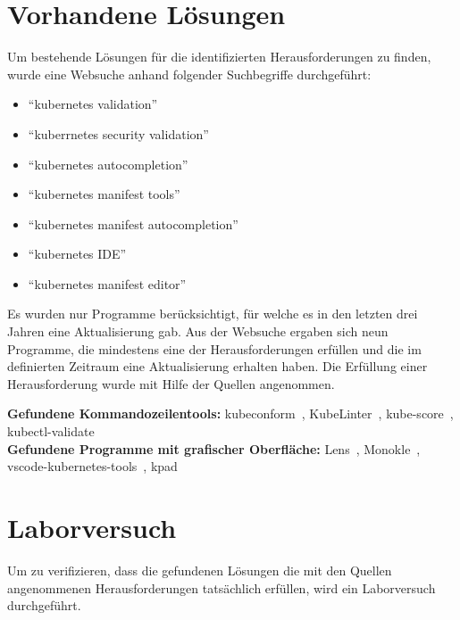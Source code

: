 \section{Vorhandene Lösungen}

Um bestehende Lösungen für die identifizierten Herausforderungen zu finden, wurde eine Websuche anhand folgender Suchbegriffe durchgeführt:
\begin{itemize}
  \setlength\itemsep{-0.5cm}
  \item ``kubernetes validation''
  \item ``kuberrnetes security validation''
  \item ``kubernetes autocompletion''
  \item ``kubernetes manifest tools''
  \item ``kubernetes manifest autocompletion''
  \item ``kubernetes IDE''
  \item ``kubernetes manifest editor''
\end{itemize}

Es wurden nur Programme berücksichtigt, für welche es in den letzten drei Jahren eine Aktualisierung gab.
Aus der Websuche ergaben sich neun Programme, die mindestens eine der Herausforderungen erfüllen und die
im definierten Zeitraum eine Aktualisierung erhalten haben.
Die Erfüllung einer Herausforderung wurde mit Hilfe der Quellen angenommen.

\textbf{Gefundene Kommandozeilentools:} kubeconform~\cite{kubeconform-source}, KubeLinter~\cite{kubelinter-source}, kube-score~\cite{kubescore-source}, kubectl-validate~\cite{kubectl-validate-source}
\\
\textbf{Gefundene Programme mit grafischer Oberfläche:} Lens~\cite{kubernetes-lens-source}, Monokle~\cite{monokle-source}, vscode-kubernetes-tools~\cite{vscode-kubernetes-tools-source}, kpad~\cite{kpad-source}


\section{Laborversuch}

Um zu verifizieren, dass die gefundenen Lösungen die mit den Quellen angenommenen Herausforderungen tatsächlich erfüllen, wird ein Laborversuch durchgeführt.

